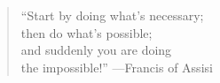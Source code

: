 

\begin{quote}
    ``Start by doing what's necessary;\\
    then do what's possible;\\
    and suddenly you are doing\\
    the impossible!'' ---Francis of Assisi
\end{quote}



